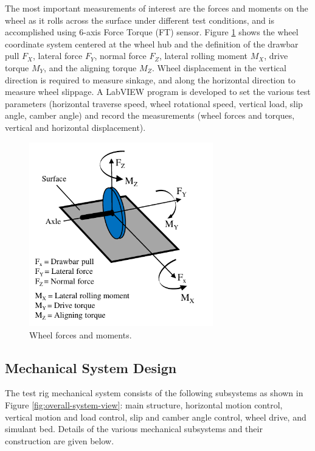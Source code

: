 \documentclass{article}
\begin{document}
The most important measurements of interest are the forces and moments on the wheel as it rolls across the surface under different test conditions, and is accomplished using 6-axis Force Torque (FT) sensor. Figure \ref{fig:wheel-forces-and-moments} shows the wheel coordinate system centered at the wheel hub and the definition of the drawbar pull $F_X$, lateral force $F_Y$, normal force $F_Z$, lateral rolling moment $M_X$, drive torque $M_Y$, and the aligning torque $M_Z$. Wheel displacement in the vertical direction is required to measure sinkage, and along the horizontal direction to measure wheel slippage. A LabVIEW program is developed to set the various test parameters (horizontal traverse speed, wheel rotational speed, vertical load, slip angle, camber angle) and record the measurements (wheel forces and torques, vertical and horizontal displacement).  

\begin{figure}[hbt!]
\centering
\includegraphics[width=3.15in]{general-images/wheel-forces-and-moments.pdf}
\caption{Wheel forces and moments.}
\label{fig:wheel-forces-and-moments}
\end{figure}


\subsection{Mechanical System Design}

The test rig mechanical system consists of the following subsystems as shown in Figure \ref{fig:overall-system-view}: main structure, horizontal motion control, vertical motion and load control, slip and camber angle control, wheel drive, and simulant bed. Details of the various mechanical subsystems and their construction are given below.
\end{document}
